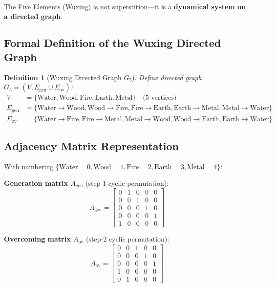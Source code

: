 \documentclass[conference]{IEEEtran}
\newtheorem{definition}[theorem]{Definition}
\theoremstyle{remark}
\begin{document}
The Five Elements (Wuxing) is not superstition---it is a \textbf{dynamical system on a directed graph}.

\subsection{Formal Definition of the Wuxing Directed Graph}

\begin{definition}[Wuxing Directed Graph $G_5$]
Define directed graph $G_5 = (V, E_{\text{gen}} \cup E_{\text{ov}})$:
\begin{align*}
V &= \{\text{Water}, \text{Wood}, \text{Fire}, \text{Earth}, \text{Metal}\} \quad\text{(5 vertices)}\\
E_{\text{gen}} &= \{\text{Water}\to\text{Wood}, \text{Wood}\to\text{Fire}, \text{Fire}\to\text{Earth}, \text{Earth}\to\text{Metal}, \text{Metal}\to\text{Water}\}\\
E_{\text{ov}} &= \{\text{Water}\to\text{Fire}, \text{Fire}\to\text{Metal}, \text{Metal}\to\text{Wood}, \text{Wood}\to\text{Earth}, \text{Earth}\to\text{Water}\}
\end{align*}
\end{definition}

\subsection{Adjacency Matrix Representation}

With numbering $\{\text{Water}=0, \text{Wood}=1, \text{Fire}=2, \text{Earth}=3, \text{Metal}=4\}$:

\textbf{Generation matrix $A_{\text{gen}}$} (step-1 cyclic permutation):
\[
A_{\text{gen}} = \begin{bmatrix}
0 & 1 & 0 & 0 & 0\\
0 & 0 & 1 & 0 & 0\\
0 & 0 & 0 & 1 & 0\\
0 & 0 & 0 & 0 & 1\\
1 & 0 & 0 & 0 & 0
\end{bmatrix}
\]

\textbf{Overcoming matrix $A_{\text{ov}}$} (step-2 cyclic permutation):
\[
A_{\text{ov}} = \begin{bmatrix}
0 & 0 & 1 & 0 & 0\\
0 & 0 & 0 & 1 & 0\\
0 & 0 & 0 & 0 & 1\\
1 & 0 & 0 & 0 & 0\\
0 & 1 & 0 & 0 & 0
\end{bmatrix}
\]
\end{document}
